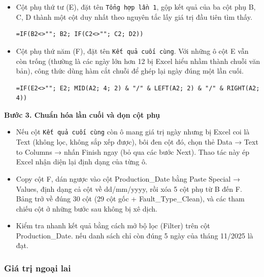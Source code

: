 \documentclass[12pt]{article}
\begin{document}
\begin{itemize}
    \item Cột phụ thứ tư (E), đặt tên \texttt{Tổng hợp lần 1}, gộp kết quả của ba cột phụ B, C, D thành một cột duy nhất theo nguyên tắc lấy giá trị đầu tiên tìm thấy.
    \begin{aivncodebox}
    \begin{lstlisting}[language=Excel]
=IF(B2<>""; B2; IF(C2<>""; C2; D2))\end{lstlisting}
    \end{aivncodebox}

    \item Cột phụ thứ năm (F), đặt tên \texttt{Kết quả cuối cùng}. Với những ô cột E vẫn còn trống (thường là các ngày lớn hơn 12 bị Excel hiểu nhầm thành chuỗi văn bản), công thức dùng hàm cắt chuỗi để ghép lại ngày đúng một lần cuối.
    \begin{aivncodebox}
    \begin{lstlisting}[language=Excel]
=IF(E2<>""; E2; MID(A2; 4; 2) & "/" & LEFT(A2; 2) & "/" & RIGHT(A2; 4))\end{lstlisting}
    \end{aivncodebox}

\end{itemize}

\noindent
\textbf{Bước 3. Chuẩn hóa lần cuối và dọn cột phụ}

\begin{itemize}
    \item Nếu cột \texttt{Kết quả cuối cùng} còn ô mang giá trị ngày nhưng bị Excel coi là Text (không lọc, không sắp xếp được), bôi đen cột đó, chọn thẻ Data → Text to Columns → nhấn Finish ngay (bỏ qua các bước Next). Thao tác này ép Excel nhận diện lại định dạng của từng ô.
    \item Copy cột F, dán ngược vào cột Production\_Date bằng Paste Special → Values, định dạng cả cột về dd/mm/yyyy, rồi xóa 5 cột phụ từ B đến F. Bảng trở về đúng 30 cột (29 cột gốc + Fault\_Type\_Clean), và các tham chiếu cột ở những bước sau không bị xê dịch.
    \item Kiểm tra nhanh kết quả bằng cách mở bộ lọc (Filter) trên cột Production\_Date. nếu danh sách chỉ còn đúng 5 ngày của tháng 11/2025 là đạt.
\end{itemize}

\subsubsection{Giá trị ngoại lai}
\end{document}
